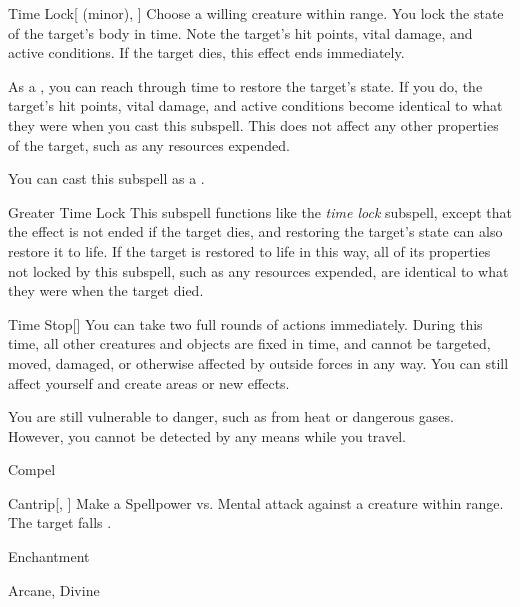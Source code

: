 \begin{ability}[\nth{6}]{Time Lock}[ (minor), ]
Choose a willing creature within \rngmed range.
You lock the state of the target's body in time.
Note the target's hit points, vital damage, and active conditions.
If the target dies, this effect ends immediately.

As a , you can reach through time to restore the target's state.
If you do, the target's hit points, vital damage, and active conditions become identical to what they were when you cast this subspell.
This does not affect any other properties of the target, such as any resources expended.

You can cast this subspell as a .
\end{ability}
\vspace{0.25em}


\begin{ability}[\nth{9}]{Greater Time Lock}
This subspell functions like the \textit{time lock} subspell, except that the effect is not ended if the target dies, and restoring the target's state can also restore it to life.
If the target is restored to life in this way, all of its properties not locked by this subspell, such as any resources expended, are identical to what they were when the target died.
\end{ability}
\vspace{0.25em}


\begin{ability}[\nth{9}]{Time Stop}[]
You can take two full rounds of actions immediately.
During this time, all other creatures and objects are fixed in time, and cannot be targeted, moved, damaged, or otherwise affected by outside forces in any way.
You can still affect yourself and create areas or new effects.

You are still vulnerable to danger, such as from heat or dangerous gases.
However, you cannot be detected by any means while you travel.
\end{ability}
\vspace{0.25em}

\newpage
\begin{spellsection}{Compel}

\begin{spellheader}
\end{spellheader}


\begin{ability}{Cantrip}[, ]
Make a Spellpower vs. Mental attack against a creature within \rngmed range.
\hit The target falls .
\end{ability}




 Enchantment

 Arcane, Divine
\end{spellsection}



